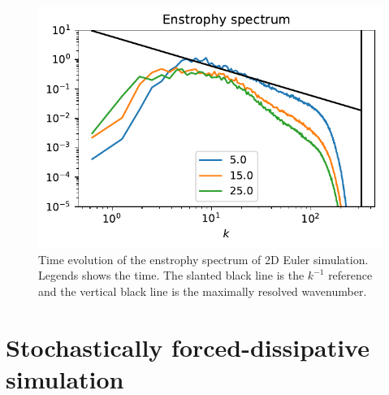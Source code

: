 \begin{figure}
    \centering
    \includegraphics{2DEuler_spec}
    \caption{Time evolution of the enstrophy spectrum of 2D Euler simulation. Legends shows the time. The slanted black line is the $k^{-1}$ reference and the vertical black line is the maximally resolved wavenumber.}
    \label{fig:2DEuler_spec}
\end{figure}

\section{Stochastically forced-dissipative simulation}